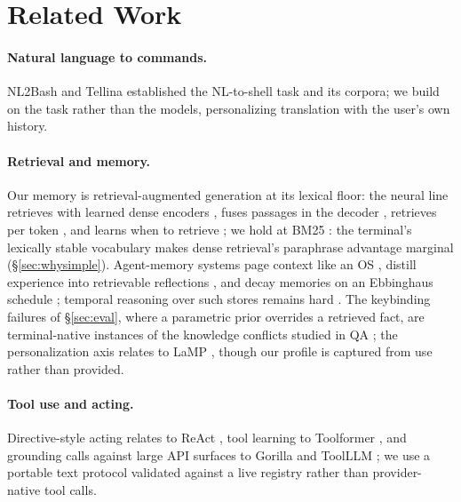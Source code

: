 \section{Related Work}
\label{sec:related}

\paragraph{Natural language to commands.}
NL2Bash \citep{lin2018nl2bash} and Tellina \citep{lin2017tellina} established the
NL-to-shell task and its corpora; we build on the task rather than the models,
personalizing translation with the user's own history.

\paragraph{Retrieval and memory.}
Our memory is retrieval-augmented generation \citep{lewis2020rag} at its lexical
floor: the neural line retrieves with learned dense encoders
\citep{guu2020realm,karpukhin2020dpr}, fuses passages in the decoder
\citep{izacard2021fid}, retrieves per token \citep{khandelwal2020knnlm}, and learns
when to retrieve \citep{asai2024selfrag}; we hold at BM25 \citep{robertson2009bm25}:
the terminal's lexically stable vocabulary makes dense retrieval's paraphrase
advantage marginal (\S\ref{sec:whysimple}). Agent-memory systems page context like an
OS \citep{packer2023memgpt}, distill experience into retrievable reflections
\citep{park2023generative}, and decay memories on an Ebbinghaus schedule
\citep{zhong2024memorybank}; temporal reasoning over such stores remains hard
\citep{maharana2024locomo}. The keybinding failures of
\S\ref{sec:eval}, where a parametric prior overrides a
retrieved fact, are terminal-native instances of the knowledge conflicts studied in QA
\citep{longpre2021entity}; the personalization axis relates to LaMP
\citep{salemi2024lamp}, though our profile is captured from use rather than provided.

\paragraph{Tool use and acting.}
Directive-style acting relates to ReAct \citep{yao2023react}, tool learning to
Toolformer \citep{schick2023toolformer}, and grounding calls against large API
surfaces to Gorilla \citep{patil2023gorilla} and ToolLLM \citep{qin2024toolllm}; we use a
portable text protocol validated against a live registry rather than provider-native
tool calls.

